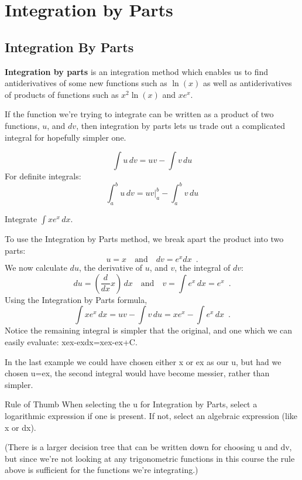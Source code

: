 \section{Integration by Parts}
\label{sec:integration-by-parts}
\subsection{Integration By Parts}
{\bf Integration by parts} is an integration method which enables us to find antiderivatives of some new functions such as $\ln(x)$ as well as antiderivatives of products of functions such as $x^2\ln(x)$ and $xe^x$.

If the function we're trying to integrate can be written as a product of two functions, $u$, and $dv$, then integration by parts lets us trade out a complicated integral for hopefully simpler one.

\begin{theorem}
$$\int u\,dv=uv-\int v\,du$$
For definite integrals:
$$\int_a^bu\,dv = \left.uv\right|_a^b - \int_a^b v \,du$$
\end{theorem}
\begin{example}
Integrate $\int xe^x\,dx$.

\begin{solution}
To use the Integration by Parts method, we break apart the product into two parts:
$$u=x\quad \text{and}\quad dv=e^xdx \enspace .$$
We now calculate $du$, the derivative of $u$, and $v$, the integral of $dv$:
$$du = \left(\frac{d}{dx}x\right)\,dx \quad \text{and} \quad v = \int e^x\,dx = e^x \enspace .$$
Using the Integration by Parts formula,
$$\int xe^x\,dx = uv-\int v\,du = xe^x - \int e^x\,dx \enspace . $$
Notice the remaining integral is simpler that the original, and one which we can easily evaluate:
xex-\int exdx=xex-ex+C.
\end{solution}\end{example}

In the last example we could have chosen either x or ex as our u, but had we chosen u=ex, the second integral would have become messier, rather than simpler.

Rule of Thumb
When selecting the u for Integration by Parts, select a logarithmic expression if one is present. If not, select an algebraic expression (like x or dx).

(There is a larger decision tree that can be written down for choosing u and dv, but since we're not looking at any trigonometric functions in this course the rule above is sufficient for the functions we're integrating.)

